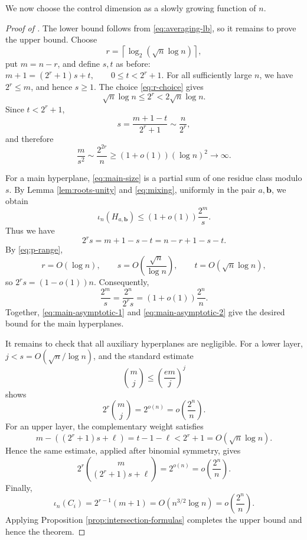 \documentclass[11pt]{article}
\newcommand{\isect}{\iota}
\newcommand{\1}{\mathbf{1}}
\begin{document}
	
	We now choose the control dimension as a slowly growing function of $n$.
	
	\begin{proof}[Proof of ]
		The lower bound follows from \eqref{eq:averaging-lb}, so it remains to prove the upper bound. Choose
		\begin{equation}\label{eq:r-choice}
			r=\left\lceil\log_2(\sqrt n\log n)\right\rceil,
		\end{equation}
		put $m=n-r$, and define $s,t$ as before:  $m+1=(2^r+1)s+t,\qquad 0\le t<2^r+1.$ For all sufficiently large $n$, we have \(2^r\leq m\), and hence \(s\geq1\). The choice \eqref{eq:r-choice} gives
		\begin{equation}\label{eq:p-range}
			\sqrt n\log n\le 2^r<2\sqrt n\log n.
		\end{equation}
		Since $t<2^r+1$,
		\[
		s=\frac{m+1-t}{2^r+1}\sim\frac{n}{2^r},
		\]
		and therefore
		\begin{equation}\label{eq:mixing}
			\frac{m}{s^2}\sim\frac{2^{2r}}{n}\ge(1+o(1))(\log n)^2\longrightarrow\infty.
		\end{equation}
		
		For a main hyperplane, \eqref{eq:main-size} is a partial sum of one residue class modulo $s$. By Lemma \ref{lem:roots-unity} and \eqref{eq:mixing}, uniformly in the pair $a,\textbf{b}$, we obtain 
		\begin{equation}\label{eq:main-asymptotic-1}
			\isect_n(H_{a,\textbf{b}})\le(1+o(1))\frac{2^m}{s}.
		\end{equation}
		Thus we have
		\[
		2^rs=m+1-s-t=n-r+1-s-t.
		\]
		By \eqref{eq:p-range},
		\[
		r=O(\log n),\qquad
		s=O\!\left(\frac{\sqrt n}{\log n}\right),\qquad
		t=O(\sqrt n\log n),
		\]
		so $2^rs=(1-o(1))n$. Consequently,
		\begin{equation}\label{eq:main-asymptotic-2}
			\frac{2^m}{s}=\frac{2^n}{2^rs}=(1+o(1))\frac{2^n}{n}.
		\end{equation}
		Together, \eqref{eq:main-asymptotic-1} and \eqref{eq:main-asymptotic-2} give the desired bound for the main hyperplanes.
		
		It remains to check that all auxiliary hyperplanes are negligible. For a lower layer, $j<s=O(\sqrt n/\log n)$, and the standard estimate
		\[
		\binom{m}{j}\le\left(\frac{em}{j}\right)^j
		\]
		shows
		\[
		2^r\binom{m}{j}=2^{o(n)}=o\!\left(\frac{2^n}{n}\right).
		\]
		For an upper layer, the complementary weight satisfies
		\[
		m-((2^r+1)s+\ell)=t-1-\ell<2^r+1=O(\sqrt n\log n).
		\]
		Hence the same estimate, applied after binomial symmetry, gives
		\[
		2^r\binom{m}{(2^r+1)s+\ell}=2^{o(n)}=o\!\left(\frac{2^n}{n}\right).
		\]
		Finally,
		\[
		\isect_n(C_i)=2^{r-1}(m+1)=O(n^{3/2}\log n)
		=o\!\left(\frac{2^n}{n}\right).
		\]
		Applying Proposition \ref{prop:intersection-formulas} completes the upper bound and hence the theorem.
	\end{proof}
	
\end{document}
